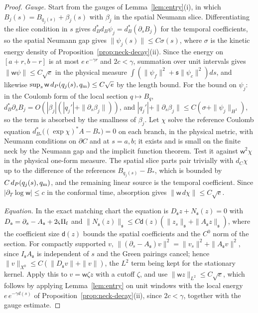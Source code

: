 \documentclass[11pt]{amsart}
\theoremstyle{definition}
\theoremstyle{remark}
\theoremstyle{plain}
\numberwithin{equation}{section}
\begin{document}
\begin{proof}
\emph{Gauge.} Start from the gauges of Lemma~\ref{lem:entry}(i), in which
$B_j(s)=B_{q_j(s)}+\beta_j(s)$ with $\beta_j$ in the spatial Neumann slice.
Differentiating the slice condition in $s$ gives
$d^*_Bd_B\psi_j=d^*_B(\partial_sB_j)$ for the temporal coefficients, so the
spatial Neumann gap gives $\|\psi_j(s)\|\le C\sigma(s)$, where $\sigma$ is the
kinetic energy density of Proposition~\ref{prop:neck-decay}(ii). Since the
energy on $[a+r,b-r]$ is at most $e\,e^{-\gamma r}$ and $2c<\gamma$, summation over
unit intervals gives $\|\mathsf w\psi\|\le C\sqrt e$ in the physical measure
$\int(\|\psi_f\|^2+{\mathfrak s}\|\psi_c\|^2)ds$, and likewise
$\sup_s \mathsf w\,d_P(q_j(s),q_{\rm m})\le C\sqrt e$ by the length bound. For the bound on
$\psi_j$: in the Coulomb form of the local section $q\mapsto B_q$,
$d^*_B\partial_sB_j=O(|\beta_j|(|q_j'|+\|\partial_s\beta_j\|))$, and
$|q_j'|+\|\partial_s\beta_j\|\le C(\sigma+\|\psi_j\|_{H^1})$, so the term is absorbed by the
smallness of $\beta_j$. Let $\chi$ solve the reference Coulomb equation
$d^*_{B_*}\bigl((\exp\chi)^*A-B_*\bigr)=0$ on each branch, in the physical metric,
with Neumann conditions on $\partial C$ and at $s=a,b$; it exists and is small on the
finite neck by the Neumann gap and the implicit function theorem. Test it against $\mathsf w^2\chi$ in the physical one-form measure.
The spatial slice parts pair trivially with $d_C\chi$ up to the difference of
the references $B_{q_j(s)}-B_*$, which is bounded by $C\,d_P(q_j(s),q_{\rm m})$, and the
remaining linear source is the temporal coefficient. Since
$|\partial_T\log \mathsf w|\le c$ in the conformal time, absorption gives
$\|\mathsf w\,d\chi\|\le C\sqrt e$.

\emph{Equation.} In the exact matching chart the equation is
$D_{\mathfrak s} z+N_{\mathfrak s}(z)=0$ with $D_{\mathfrak s}=\partial_s-A_{\mathfrak s}+2\varsigma\Pi_{\rm f}$ and
$\|N_{\mathfrak s}(z)\|_{\mathfrak s}\le C\mathsf d(z)(\|z_s\|_{\mathfrak s}+\|A_{\mathfrak s} z\|_{\mathfrak s})$, where
the coefficient size $\mathsf d(z)$ bounds the spatial coefficients and the $C^0$ norm of the section.
For compactly supported $v$, $\|(\partial_s-A_{\mathfrak s})v\|^2=\|v_s\|^2+\|A_{\mathfrak s}
v\|^2$, since $I_{\mathfrak s} A_{\mathfrak s}$ is independent of $s$ and the Green
pairings cancel; hence $\|v\|_{X^0}\le C(\|D_{\mathfrak s} v\|+\|v\|)$, the
$L^2$ term being kept for the stationary kernel. Apply this to $v=\mathsf w\zeta z$
with a cutoff $\zeta$, and use $\|\mathsf wz\|_{L^2}\le C\sqrt e$, which follows by
applying Lemma~\ref{lem:entry} on unit windows with the local energy
$e\,e^{-\gamma d(s)}$ of Proposition~\ref{prop:neck-decay}(ii), since $2c<\gamma$,
together with the gauge estimate.
\end{proof}
\end{document}
